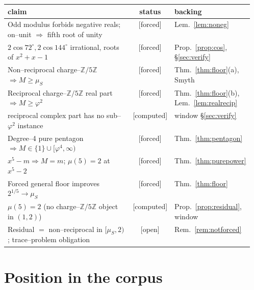 \documentclass[11pt]{article}
\newcommand{\forced}{\textcolor{cforced}{\textsf{[forced]}}}
\newcommand{\computed}{\textcolor{ccomp}{\textsf{[computed]}}}
\newcommand{\open}{\textcolor{copen}{\textsf{[open]}}}
\newcommand{\Z}{\mathbb{Z}}
\newcommand{\Mah}{M}
\newcommand{\muS}{\mu_S}
\newcommand{\Zfive}{\Z/5\Z}
\theoremstyle{plain}
\theoremstyle{definition}
\theoremstyle{remark}
\begin{document}
\begin{center}\small
\begin{tabular}{p{0.56\linewidth}cl}
\toprule
claim & status & backing\\
\midrule
Odd modulus forbids negative reals; on--unit $\Rightarrow$ fifth root of unity & \forced{} & Lem.~\ref{lem:noneg}\\
$2\cos72^\circ,2\cos144^\circ$ irrational, roots of $x^2+x-1$ & \forced{} & Prop.~\ref{prop:cos}, \S\ref{sec:verify}\\
Non--reciprocal charge--$\Zfive$ $\Rightarrow\Mah\ge\muS$ & \forced{} & Thm.~\ref{thm:floor}(a), Smyth\\
Reciprocal charge--$\Zfive$ real part $\Rightarrow\Mah\ge\varphi^2$ & \forced{} & Thm.~\ref{thm:floor}(b), Lem.~\ref{lem:realrecip}\\
\quad reciprocal complex part has no sub--$\varphi^2$ instance & \computed{} & window \S\ref{sec:verify}\\
Degree--4 pure pentagon $\Rightarrow\Mah\in\{1\}\cup[\varphi^4,\infty)$ & \forced{} & Thm.~\ref{thm:pentagon}\\
$x^5-m\Rightarrow\Mah=m$; $\mu(5)=2$ at $x^5-2$ & \forced{} & Thm.~\ref{thm:purepower}\\
Forced general floor improves $2^{1/5}\to\muS$ & \forced{} & Thm.~\ref{thm:floor}\\
$\mu(5)=2$ (no charge--$\Zfive$ object in $(1,2)$) & \computed{} & Prop.~\ref{prop:residual}, window\\
Residual $=$ non--reciprocal in $[\muS,2)$; trace--problem obligation & \open{} & Rem.~\ref{rem:notforced}\\
\bottomrule
\end{tabular}
\end{center}

\section{Position in the corpus}
\end{document}
